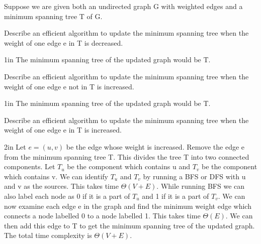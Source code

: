 \begin{prob}
	Suppose we are given both an undirected graph G with weighted edges and a minimum spanning tree T of G.
	\begin{subprobset}
	    \begin{subprob}
    		Describe an efficient algorithm to update the minimum spanning tree when the weight of one edge e in T is decreased.
    		\begin{responsebox}{1in}
    		    The minimum spanning tree of the updated graph would be T.
    		\end{responsebox}
	    \end{subprob}

        \newpage

	    \begin{subprob}
    		Describe an efficient algorithm to update the minimum spanning tree when the weight of one edge e not in T is increased.
    		\begin{responsebox}{1in}
    		    The minimum spanning tree of the updated graph would be T.
    		\end{responsebox}
	    \end{subprob}

  	    \begin{subprob}
    		Describe an efficient algorithm to update the minimum spanning tree when the weight of one edge e in T is increased.
    		\begin{responsebox}{2in}
    		    Let $e = (u,v)$ be the edge whose weight is increased. Remove the edge e from the minimum spanning tree T.
    		    This divides the tree T into two connected components. Let $T_u$ be the component which contains u and $T_v$ be the component which contains v.
    		    We can identify $T_u$ and $T_v$ by running a BFS or DFS with u and v as the sources. This takes time $\Theta(V + E)$.
    		    While running BFS we can also label each node as 0 if it is a part of $T_u$ and 1 if it is a part of $T_v$.
    		    We can now examine each edge e in the graph and find the minimum weight edge which connects a node labelled 0 to a node labelled 1.
    		    This takes time $\Theta(E)$.
    		    We can then add this edge to T to get the minimum spanning tree of the updated graph. The total time complexity is $\Theta(V + E)$.
    		\end{responsebox}
	    \end{subprob}



\end{subprobset}
\end{prob}
